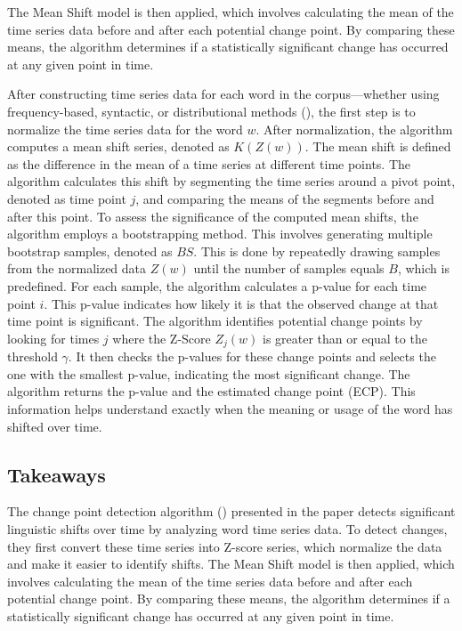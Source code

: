 The Mean Shift model is then applied, which involves calculating the mean of the time series data before and after each potential change point.
By comparing these means, the algorithm determines if a statistically significant change has occurred at any given point in time.


After constructing time series data for each word in the corpus—whether using frequency-based, syntactic, or distributional methods (), the first step is to normalize the time series data for the word $w$.
After normalization, the algorithm computes a mean shift series, denoted as $K(Z(w))$.
The mean shift is defined as the difference in the mean of a time series at different time points.
The algorithm calculates this shift by segmenting the time series around a pivot point, denoted as time point $j$, and comparing the means of the segments before and after this point.
To assess the significance of the computed mean shifts, the algorithm employs a bootstrapping method.
This involves generating multiple bootstrap samples, denoted as $BS$.
This is done by repeatedly drawing samples from the normalized data $Z(w)$ until the number of samples equals $B$, which is predefined.
For each sample, the algorithm calculates a p-value for each time point $i$.
This p-value indicates how likely it is that the observed change at that time point is significant.
The algorithm identifies potential change points by looking for times $j$ where the Z-Score $Z_j(w)$ is greater than or equal to the threshold $\gamma$.
It then checks the p-values for these change points and selects the one with the smallest p-value, indicating the most significant change.
The algorithm returns the p-value and the estimated change point (ECP).
This information helps understand exactly when the meaning or usage of the word has shifted over time.

\subsection{Takeaways}\label{subsec:takeaways2}
The change point detection algorithm () presented in the paper detects significant linguistic shifts over time by analyzing word time series data.
To detect changes, they first convert these time series into Z-score series, which normalize the data and make it easier to identify shifts.
The Mean Shift model is then applied, which involves calculating the mean of the time series data before and after each potential change point.
By comparing these means, the algorithm determines if a statistically significant change has occurred at any given point in time.

